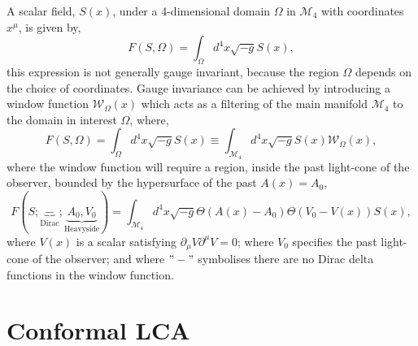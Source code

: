 A scalar field, $S(x)$, under a 4-dimensional domain $\Omega$ in $\mathcal{M}_4$ with coordinates $x^\mu$, is given by,
\begin{equation}
    F(S,\Omega)=\int_\Omega d^4x \sqrt{-g}S(x),
\end{equation}
this expression is not generally gauge invariant, because the region $\Omega$ depends on the choice of coordinates. Gauge invariance can be achieved by introducing a window function $\mathcal{W}_\Omega(x)$ which acts as a filtering of the main manifold $\mathcal{M}_4$ to the domain in interest $\Omega$, where,
\begin{equation}
    F(S,\Omega)=\int_\Omega d^4x \sqrt{-g}S(x)\equiv \int_{\mathcal{M}_4} d^4x \sqrt{-g}S(x)\mathcal{W}_\Omega (x),
\end{equation}
where the window function will require a region, inside the past light-cone of the observer, bounded by the hypersurface of the past $A(x)=A_0$,
\begin{equation}
F(S;\underbrace{-}_{\text{Dirac}};\underbrace{A_0,V_0}_{\text{Heavyside}})=\int_{\mathcal{M}_4} d^4x \sqrt{-g}\Theta(A(x)-A_0)\Theta(V_0-V(x))S(x),
\end{equation}
where $V(x)$ is a scalar satisfying $\partial_\mu V\partial^\mu V=0$; where $V_0$ specifies the past light-cone of the observer; and where $"-"$ symbolises there are no Dirac delta functions in the window function.



\section{Conformal LCA}

